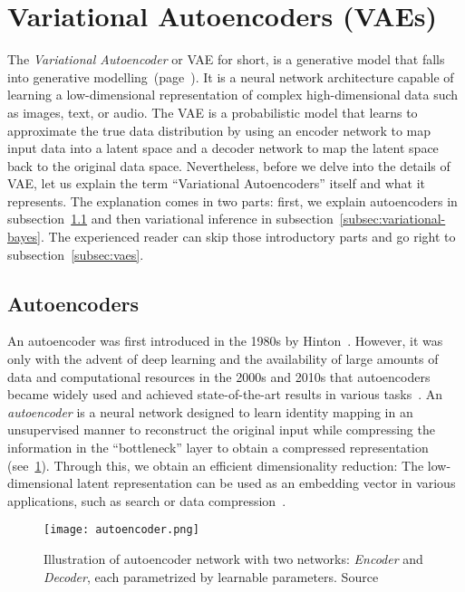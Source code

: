 \section{Variational Autoencoders (VAEs)}
\label{sec:vae}
The \textit{Variational Autoencoder} or VAE for short, is a generative model that falls into generative modelling~(page~\pageref{generative-modelling}). 
It is a neural network architecture capable of learning a low-dimensional representation of complex high-dimensional data such as 
images, text, or audio. The VAE is a probabilistic model that learns to approximate the true data distribution by using an encoder network to 
map input data into a latent space and a decoder network to map the latent space back to the original data space. Nevertheless, before we delve into the details of VAE, 
let us explain the term ``Variational Autoencoders'' itself and what it represents. The explanation comes in two parts: first, we explain 
autoencoders in subsection~\ref{subsec:autoencoders} and then variational inference in subsection~\ref{subsec:variational-bayes}. The experienced reader can skip those 
introductory parts and go right to subsection~\ref{subsec:vaes}.

\subsection{Autoencoders}
\label{subsec:autoencoders}
An autoencoder was first introduced in the 1980s by Hinton~\cite{autoencoders-1986}. However, it was only with the advent of deep learning 
and the availability of large amounts of data and computational resources in the 2000s and 2010s that autoencoders became widely used and 
achieved state-of-the-art results in various tasks~\cite {dim-reduction-ae-2006}. An \textit{autoencoder} is a neural network designed to learn 
identity mapping in an unsupervised manner to reconstruct the original input while compressing the information in the ``bottleneck'' layer 
to obtain a compressed representation (see~\ref{fig:autoencoder}). Through this, we obtain an efficient dimensionality reduction: The low-dimensional 
latent representation can be used as an embedding vector in various applications, such as search or data compression~\cite{ae-blog-2018}.

\begin{figure}[t]
    \centering
    \texttt{[image: autoencoder.png]}
    \caption[Autoencoder]{Illustration of autoencoder network with two networks: \textit{Encoder} and \textit{Decoder}, each parametrized by 
    learnable parameters. Source \cite{ae-blog-2018}}
    \label{fig:autoencoder}
\end{figure}

